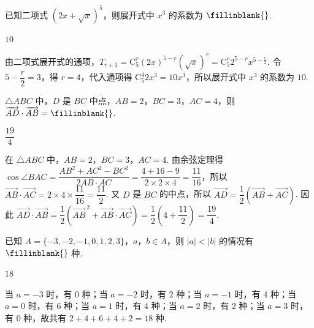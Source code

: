 \begin{problem}
已知二项式 \((2x+\sqrt{x})^5\)，则展开式中 \(x^3\) 的系数为 \(\fillinblank{}\).
\end{problem}

\begin{answer}
\(10\)
\end{answer}

\begin{solution}
由二项式展开式的通项，\(T_{r+1}=\mathrm C_5^r(2x)^{5-r}(\sqrt{x})^r=\mathrm C_5^r2^{5-r}x^{5-\frac{r}{2}}\). 令 \(5-\dfrac{r}{2}=3\)，得 \(r=4\)，代入通项得 \(\mathrm C_5^4 2x^3=10x^3\)，所以展开式中 \(x^3\) 的系数为 \(10\).
\end{solution}

\begin{problem}
\(\triangle ABC\) 中，\(D\) 是 \(BC\) 中点，\(AB=2\)，\(BC=3\)，\(AC=4\)，则 \(\overrightarrow{AD}\cdot\overrightarrow{AB}=\fillinblank{}\).
\end{problem}

\begin{answer}
\(\dfrac{19}{4}\)
\end{answer}

\begin{solution}
在 \(\triangle ABC\) 中，\(AB=2\)，\(BC=3\)，\(AC=4\). 由余弦定理得 \(\cos\angle BAC=\dfrac{AB^2+AC^2-BC^2}{2AB\cdot AC}=\dfrac{4+16-9}{2\times2\times4}=\dfrac{11}{16}\)，所以 \(\overrightarrow{AB}\cdot\overrightarrow{AC}=2\times4\times\dfrac{11}{16}=\dfrac{11}{2}\). 又 \(D\) 是 \(BC\) 的中点，所以 \(\overrightarrow{AD}=\dfrac{1}{2}(\overrightarrow{AB}+\overrightarrow{AC})\). 因此 \(\overrightarrow{AD}\cdot\overrightarrow{AB}=\dfrac{1}{2}(\overrightarrow{AB}^{\,2}+\overrightarrow{AB}\cdot\overrightarrow{AC})=\dfrac{1}{2}\left(4+\dfrac{11}{2}\right)=\dfrac{19}{4}\).
\end{solution}

\begin{problem}
已知 \(A=\{-3,-2,-1,0,1,2,3\}\)，\(a\)，\(b\in A\)，则 \(|a|<|b|\) 的情况有 \(\fillinblank{}\) 种.
\end{problem}

\begin{answer}
\(18\)
\end{answer}

\begin{solution}
当 \(a=-3\) 时，有 \(0\) 种；当 \(a=-2\) 时，有 \(2\) 种；当 \(a=-1\) 时，有 \(4\) 种；当 \(a=0\) 时，有 \(6\) 种；当 \(a=1\) 时，有 \(4\) 种；当 \(a=2\) 时，有 \(2\) 种；当 \(a=3\) 时，有 \(0\) 种，故共有 \(2+4+6+4+2=18\) 种.
\end{solution}

